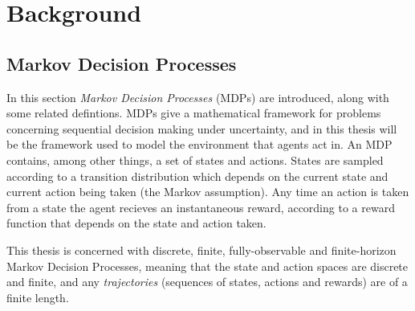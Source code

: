 

\chapter{\label{ch:2-background}Background}

    \minitoc








    


\section{Markov Decision Processes}
\label{sec:2-1-mdps}

    In this section \textit{Markov Decision Processes} (MDPs) are introduced, along with some related defintions. MDPs give a mathematical framework for problems concerning sequential decision making under uncertainty, and in this thesis will be the framework used to model the environment that agents act in. An MDP contains, among other things, a set of states and actions. States are sampled according to a transition distribution which depends on the current state and current action being taken (the Markov assumption). Any time an action is taken from a state the agent recieves an instantaneous reward, according to a reward function that depends on the state and action taken.

    This thesis is concerned with discrete, finite, fully-observable and finite-horizon Markov Decision Processes, meaning that the state and action spaces are discrete and finite, and any \textit{trajectories} (sequences of states, actions and rewards) are of a finite length. 


